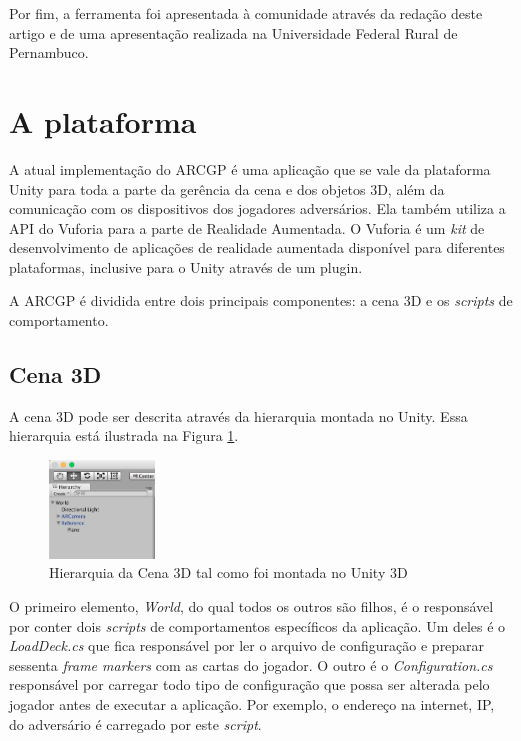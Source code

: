 \documentclass[conference]{IEEEtran}
\begin{document}
Por fim, a ferramenta foi apresentada à comunidade através da redação deste 
artigo e de uma apresentação realizada na Universidade Federal Rural de 
Pernambuco.

\section{A plataforma}
\label{plataforma}
A atual implementação do ARCGP é uma aplicação que se vale da plataforma Unity 
\cite{unity} para toda a parte da gerência da cena e dos objetos 3D, além da 
comunicação com os dispositivos dos jogadores adversários. Ela também utiliza a 
API do Vuforia \cite{vuforia} para a parte de Realidade Aumentada. O Vuforia é 
um \textit{kit} de desenvolvimento de aplicações de realidade aumentada 
disponível para diferentes plataformas, inclusive para o Unity através de  um 
plugin.

A ARCGP é dividida entre dois principais componentes: a cena 3D e os 
\textit{scripts} de comportamento.

\subsection{Cena 3D}
\label{cena3d}
A cena 3D pode ser descrita através da hierarquia montada no Unity. Essa 
hierarquia está ilustrada na Figura \ref{hierarchy}.

\begin{figure}[t]
	\caption{Hierarquia da Cena 3D tal como foi montada no Unity 3D}
	\label{hierarchy}
	\centering
	\includegraphics[width=0.25\textwidth]{hierarchy}
\end{figure}

O primeiro elemento, \textit{World}, do qual todos os outros são filhos, é o 
responsável por conter dois \textit{scripts} de comportamentos específicos da 
aplicação. Um deles é o \textit{LoadDeck.cs} que fica responsável por ler o 
arquivo de configuração e preparar sessenta \textit{frame markers} com as cartas 
do jogador. O outro é o \textit{Configuration.cs} responsável por carregar todo 
tipo de configuração que possa ser alterada pelo jogador antes de executar a 
aplicação. Por exemplo, o endereço na internet, IP, do adversário é carregado 
por este \textit{script}.
\end{document}
